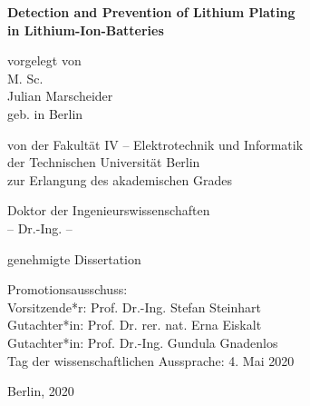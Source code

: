 \documentclass[
a4paper,
12pt,
titlepage,
bibliography=totoc,
twoside=on,
parskip = false,
numbers=noenddot,
cleardoublepage=empty,
DIV=12,
BCOR=12.0mm,
headings = openright,
]{scrreprt}
\begin{document}

%
%
\begin{titlepage}

\thispagestyle{empty}
\begin{singlespace}
\begin{center}
\vspace*{15pt}
\begin{onehalfspace}
\Huge{\textbf{Detection and Prevention of Lithium Plating}}\\
\vspace*{10pt}
\Large{\textbf{{}in Lithium-Ion-Batteries}}
\end{onehalfspace}
\vspace*{30pt}
\large{vorgelegt von\\
M. Sc.\\
Julian Marscheider\\
geb. in Berlin}\\
\vspace*{40pt}

\large{
von der Fakultät IV -- Elektrotechnik und Informatik\\
der Technischen Universität Berlin\\
zur Erlangung des akademischen Grades\\}
\vspace{17pt}

\large{
Doktor der Ingenieurswissenschaften\\
-- Dr.-Ing. --\\
}

\vspace{12pt}

\large{genehmigte Dissertation\\}
\end{center}

\vspace{36pt}
\begin{flushleft}
\large{Promotionsausschuss:\\}
\large{Vorsitzende*r: Prof. Dr.-Ing. Stefan Steinhart\\
Gutachter*in: Prof. Dr. rer. nat. Erna Eiskalt\\
Gutachter*in: Prof. Dr.-Ing. Gundula Gnadenlos\\
}
\vspace{10pt}
\large{Tag der wissenschaftlichen Aussprache: 4. Mai 2020\\}
\end{flushleft}
\vspace{10pt}
\begin{center}
\large{Berlin, 2020}
\end{center}
\end{singlespace}
\end{titlepage}
\end{document}
